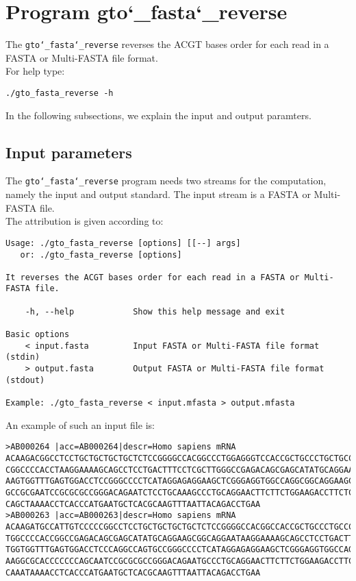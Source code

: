 \section{Program gto\char`_fasta\char`_reverse}
The \texttt{gto\char`_fasta\char`_reverse} reverses the ACGT bases order for each read in a FASTA or Multi-FASTA file format.\\
For help type:
\begin{lstlisting}
./gto_fasta_reverse -h
\end{lstlisting}
In the following subsections, we explain the input and output paramters.

\subsection*{Input parameters}

The \texttt{gto\char`_fasta\char`_reverse} program needs two streams for the computation, namely the input and output standard. The input stream is a FASTA or Multi-FASTA file.\\
The attribution is given according to:
\begin{lstlisting}
Usage: ./gto_fasta_reverse [options] [[--] args]
   or: ./gto_fasta_reverse [options]

It reverses the ACGT bases order for each read in a FASTA or Multi-FASTA file.

    -h, --help            Show this help message and exit

Basic options
    < input.fasta         Input FASTA or Multi-FASTA file format (stdin)
    > output.fasta        Output FASTA or Multi-FASTA file format (stdout)

Example: ./gto_fasta_reverse < input.mfasta > output.mfasta
\end{lstlisting}
An example of such an input file is:
\begin{lstlisting}
>AB000264 |acc=AB000264|descr=Homo sapiens mRNA 
ACAAGACGGCCTCCTGCTGCTGCTGCTCTCCGGGGCCACGGCCCTGGAGGGTCCACCGCTGCCCTGCTGCCATTGTCCC
CGGCCCCACCTAAGGAAAAGCAGCCTCCTGACTTTCCTCGCTTGGGCCGAGACAGCGAGCATATGCAGGAAGCGGCAGG
AAGTGGTTTGAGTGGACCTCCGGGCCCCTCATAGGAGAGGAAGCTCGGGAGGTGGCCAGGCGGCAGGAAGCAGGCCAGT
GCCGCGAATCCGCGCGCCGGGACAGAATCTCCTGCAAAGCCCTGCAGGAACTTCTTCTGGAAGACCTTCTCCACCCCCC
CAGCTAAAACCTCACCCATGAATGCTCACGCAAGTTTAATTACAGACCTGAA
>AB000263 |acc=AB000263|descr=Homo sapiens mRNA 
ACAAGATGCCATTGTCCCCCGGCCTCCTGCTGCTGCTGCTCTCCGGGGCCACGGCCACCGCTGCCCTGCCCCTGGAGGG
TGGCCCCACCGGCCGAGACAGCGAGCATATGCAGGAAGCGGCAGGAATAAGGAAAAGCAGCCTCCTGACTTTCCTCGCT
TGGTGGTTTGAGTGGACCTCCCAGGCCAGTGCCGGGCCCCTCATAGGAGAGGAAGCTCGGGAGGTGGCCAGGCGGCAGG
AAGGCGCACCCCCCCAGCAATCCGCGCGCCGGGACAGAATGCCCTGCAGGAACTTCTTCTGGAAGACCTTCTCCTCCTG
CAAATAAAACCTCACCCATGAATGCTCACGCAAGTTTAATTACAGACCTGAA
\end{lstlisting}

